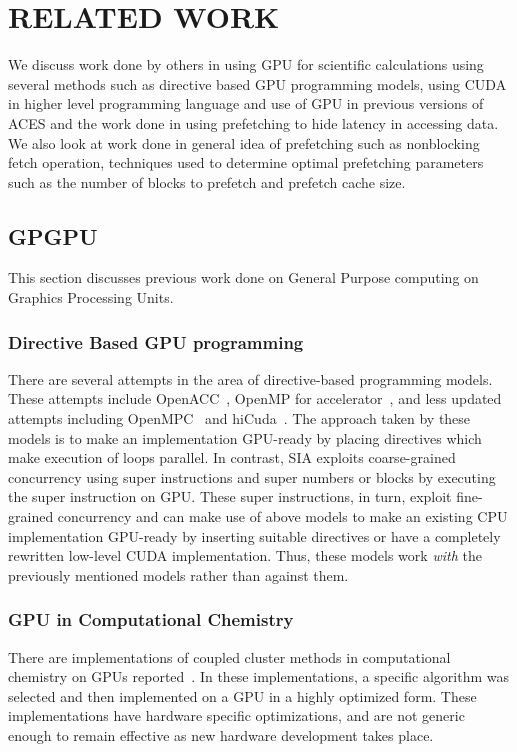 \chapter{RELATED WORK}\label{lit}

We discuss work done by others in using GPU for scientific calculations using
several methods such as directive based GPU programming models, using CUDA in
higher level programming language and use of GPU in previous versions of ACES
and the work done in using prefetching to hide latency in accessing data. We also look
at work done in general idea of prefetching such as nonblocking fetch operation,
techniques used to determine optimal prefetching parameters such as the number of
blocks to prefetch and prefetch cache size.

\section{GPGPU}
This section discusses previous work done on General Purpose computing on Graphics
Processing Units.

\subsection{Directive Based GPU programming}
There are several attempts in the area of directive-based programming models. These
attempts include OpenACC~\cite{openacc}, OpenMP for
accelerator~\cite{openmpforaccelerators}, and less updated attempts including
OpenMPC~\cite{openmpc} and hiCuda~\cite{hicuda}. The approach taken by these models
is to make an implementation GPU-ready by placing directives which make
execution of loops parallel. In contrast, SIA exploits coarse-grained
concurrency using super instructions and super numbers or blocks by executing
the super instruction on GPU. These super instructions, in turn, exploit fine-grained
concurrency and can make use of above models to make an existing CPU implementation
GPU-ready by inserting suitable directives or have a completely rewritten low-level
CUDA implementation. Thus, these models work \textit{with} the previously mentioned
models rather than against them.

\subsection{GPU in Computational Chemistry}
There are implementations of coupled cluster methods in computational chemistry
on GPUs reported~\cite{bhaskar2013}\cite{deprince2011}\cite{maw2011}. In these
implementations, a specific algorithm was selected and then implemented on a
GPU in a highly optimized form. These implementations have hardware specific
optimizations, and are not generic enough to remain effective as new hardware
development takes place.

